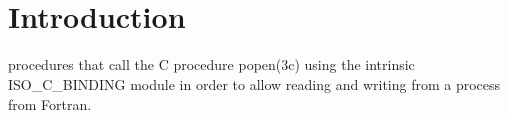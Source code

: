     

    \hypertarget{index_Introduction}{}\section{Introduction}\label{index_Introduction}
procedures that call the C procedure popen(3c) using the intrinsic I\+S\+O\+\_\+\+C\+\_\+\+B\+I\+N\+D\+I\+NG module in order to allow reading and writing from a process from Fortran.

      